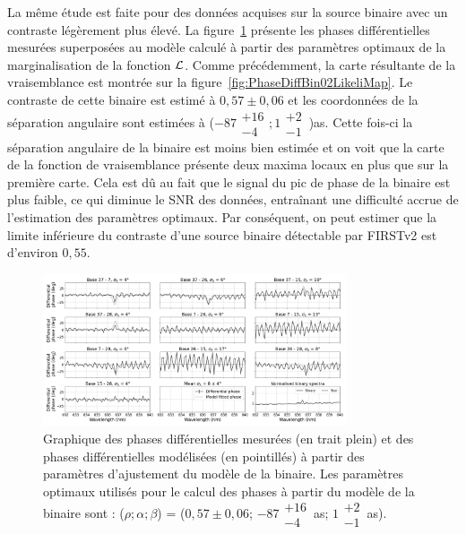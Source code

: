 La même étude est faite pour des données acquises sur la source binaire avec un contraste légèrement plus élevé. La figure~\ref{fig:PhaseDiffBin02LikeliFit} présente les phases différentielles mesurées superposées au modèle calculé à partir des paramètres optimaux de la marginalisation de la fonction $\mathcal{L}$. Comme précédemment, la carte résultante de la vraisemblance est montrée sur la figure~\ref{fig:PhaseDiffBin02LikeliMap}. Le contraste de cette binaire est estimé à $0,57 \pm 0,06$ et les coordonnées de la séparation angulaire sont estimées à ($-87\substack{+16 \\ -4}; 1\substack{+2 \\ -1} \,$)as. Cette fois-ci la séparation angulaire de la binaire est moins bien estimée et on voit que la carte de la fonction de vraisemblance présente deux maxima locaux en plus que sur la première carte. Cela est dû au fait que le signal du pic de phase de la binaire est plus faible, ce qui diminue le \ac{SNR} des données, entraînant une difficulté accrue de l'estimation des paramètres optimaux. Par conséquent, on peut estimer que la limite inférieure du contraste d'une source binaire détectable par \ac{FIRSTv2} est d'environ $0,55$.

\begin{figure}[ht!]
    \centering
    \includegraphics[width=0.8\textwidth]{Figure_Chap4/20221010_Bin02_SpeDiffPhase_Calp2vm_FitLikeli_BaseSubplot_Pola1_LaTex.png}
    \caption[Graphique des phases différentielles mesurées et des phases différentielles modélisées à partir des paramètres d'ajustement du modèle de la binaire.]{Graphique des phases différentielles mesurées (en trait plein) et des phases différentielles modélisées (en pointillés) à partir des paramètres d'ajustement du modèle de la binaire. Les paramètres optimaux utilisés pour le calcul des phases à partir du modèle de la binaire sont : ($\rho; \alpha; \beta$) = ($0,57 \pm 0,06$; $-87\substack{+16 \\ -4} \,$as; $1\substack{+2 \\ -1} \,$as).}
    \label{fig:PhaseDiffBin02LikeliFit}
\end{figure}

